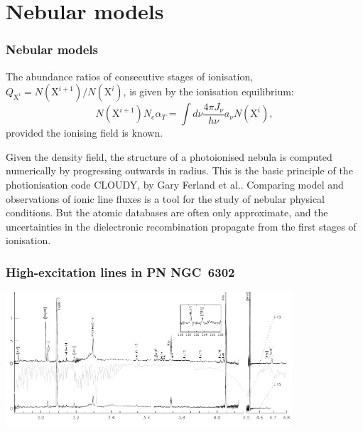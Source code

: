\section{Nebular models}
\begin{frame}\frametitle{Nebular models}

The abundance ratios of consecutive stages of ionisation,
$Q_{\mathrm{X}^{i}}=N(\mathrm{X}^{i+1})/N(\mathrm{X}^{i})$, is given
by the ionisation equilibrium:
\begin{equation}
N(\mathrm{X}^{i+1}) N_{e} \alpha_{T} = {\int}d{\nu} \frac{4\pi J_{\nu}}{h\nu}
a_{\nu} N(\mathrm{X}^{i}), 
\end{equation}
provided the ionising field is known. 
  


Given the density field, the structure of a photoionised nebula is
computed numerically by progressing outwards in radius. This is the
basic principle of the photionisation code {\small CLOUDY}, by Gary
Ferland et al.. Comparing model and observations of ionic line fluxes
is a tool for the study of nebular physical conditions. But the atomic
databases are often only approximate, and the uncertainties in the
dielectronic recombination propagate from the first stages of
ionisation.


\end{frame}
\begin{frame}\frametitle{High-excitation lines in PN NGC~6302}

\begin{center}
  \includegraphics[width=0.8\textwidth,height=!]{./C/specCGS4.pdf}
\end{center}

\end{frame}


